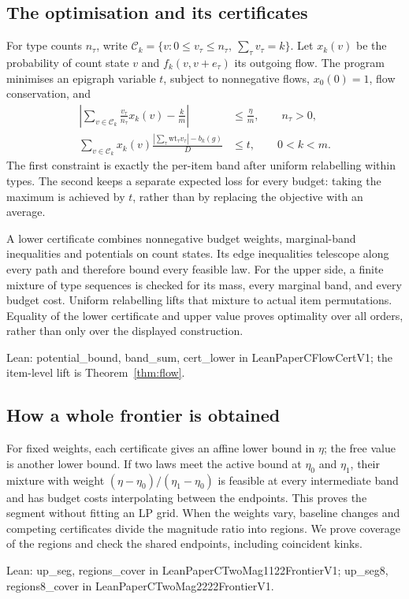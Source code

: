 \documentclass[conference]{IEEEtran}
\theoremstyle{definition}
\newcommand{\lean}[1]{\textsf{\footnotesize #1}}
\newcommand{\leanbox}[1]{%
  \par\vspace{2pt}\noindent
  {\raggedright\footnotesize\textsf{Lean: #1}\par}\vspace{2pt}}
\begin{document}
\subsection{The optimisation and its certificates}
For type counts $n_\tau$, write
$\mathcal C_k=\{v:0\le v_\tau\le n_\tau,\ \sum_\tau v_\tau=k\}$.
Let $x_k(v)$ be the probability of count state $v$ and $f_k(v,v+e_\tau)$ its outgoing
flow. The program minimises an epigraph variable $t$, subject to nonnegative flows,
$x_0(0)=1$, flow conservation, and
\begin{align}
\left|\sum_{v\in\mathcal C_k}\frac{v_\tau}{n_\tau}x_k(v)-\frac{k}{m}\right|
&\le\frac{\eta}{m},\qquad n_\tau>0,\label{eq:flowband}\\
\sum_{v\in\mathcal C_k}x_k(v)
\frac{|\sum_\tau\mathrm{wt}_\tau v_\tau|-b_k(g)}{D}
&\le t,\qquad 0<k<m.\label{eq:flowobjective}
\end{align}
The first constraint is exactly the per-item band after uniform relabelling within types.
The second keeps a separate expected loss for every budget: taking the maximum is achieved
by $t$, rather than by replacing the objective with an average.

A lower certificate combines nonnegative budget weights, marginal-band inequalities and
potentials on count states. Its edge inequalities telescope along every path and therefore
bound every feasible law. For the upper side, a finite mixture of type sequences is checked
for its mass, every marginal band, and every budget cost. Uniform relabelling lifts that
mixture to actual item permutations. Equality of the lower certificate and upper value proves
optimality over all orders, rather than only over the displayed construction.
\leanbox{\lean{potential\_bound}, \lean{band\_sum}, \lean{cert\_lower} in
\lean{LeanPaperCFlowCertV1}; the item-level lift is Theorem~\ref{thm:flow}.}

\subsection{How a whole frontier is obtained}
For fixed weights, each certificate gives an affine lower bound in $\eta$; the free value is
another lower bound. If two laws meet the active bound at $\eta_0$ and $\eta_1$, their mixture
with weight $(\eta-\eta_0)/(\eta_1-\eta_0)$ is feasible at every intermediate band and has
budget costs interpolating between the endpoints. This proves the segment without fitting
an LP grid. When the weights vary, baseline changes and competing certificates divide the
magnitude ratio into regions. We prove coverage of the regions and check the shared
endpoints, including coincident kinks.
\leanbox{\lean{up\_seg}, \lean{regions\_cover} in \lean{LeanPaperCTwoMag1122FrontierV1};
\lean{up\_seg8}, \lean{regions8\_cover} in \lean{LeanPaperCTwoMag2222FrontierV1}.}
\end{document}
